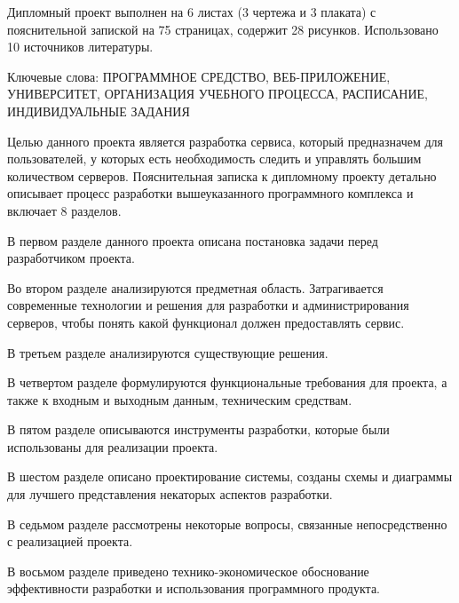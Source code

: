 \thispagestyle{empty}


Дипломный проект выполнен на 6 листах (3 чертежа и 3 плаката) с пояснительной запиской на 75 страницах, содержит 28 рисунков. Использовано 10 источников литературы.

Ключевые слова:
\MakeUppercase{Программное средство, веб-приложение, университет, организация учебного процесса, расписание, индивидуальные задания}

Целью данного проекта является разработка сервиса, который предназначем для пользователей, у которых есть необходимость следить и управлять большим количеством серверов. Пояснительная записка к дипломному проекту детально описывает процесс разработки
вышеуказанного программного комплекса и включает 8 разделов.

В первом разделе данного проекта описана постановка задачи перед
разработчиком проекта.

Во втором разделе анализируются предметная область. Затрагивается
современные технологии и решения для разработки и администрирования серверов, чтобы понять какой функционал должен предоставлять сервис.

В третьем разделе анализируются существующие решения.

В четвертом разделе формулируются функциональные требования для
проекта, а также к входным и выходным данным, техническим средствам.

В пятом разделе описываются инструменты разработки, которые были
использованы для реализации проекта.

В шестом разделе описано проектирование системы, созданы схемы и  диаграммы для лучшего представления некаторых аспектов разработки.

В седьмом разделе рассмотрены некоторые вопросы, связанные
непосредственно с реализацией проекта.

В восьмом разделе приведено технико-экономическое обоснование
эффективности разработки и использования программного продукта.
